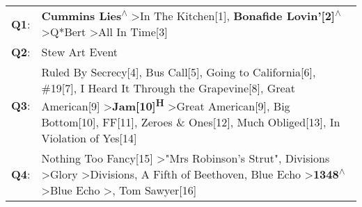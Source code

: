 \begin{supertabular}{p{0.03\textwidth}p{0.92\textwidth}}
 \textbf{Q1}:  &                                                                                                                                                                                                                                                                                                                                                       \textbf{Cummins Lies\textsuperscript{$\wedge$}} \textgreater \enspace In The Kitchen[1]\textsuperscript{}, \enspace \textbf{Bonafide Lovin'[2]\textsuperscript{$\wedge$}} \textgreater \enspace Q*Bert\textsuperscript{} \textgreater \enspace All In Time[3]\textsuperscript{}  \enspace  \\
 \textbf{Q2}:  &                                                                                                                                                                                                                                                                                                                                                                                                                                                                                                                                                                                                      Stew Art Event\textsuperscript{}  \enspace  \\
 \textbf{Q3}:  &  Ruled By Secrecy[4]\textsuperscript{}, \enspace Bus Call[5]\textsuperscript{}, \enspace Going to California[6]\textsuperscript{}, \enspace \#19[7]\textsuperscript{}, \enspace I Heard It Through the Grapevine[8]\textsuperscript{}, \enspace Great American[9]\textsuperscript{} \textgreater \enspace \textbf{Jam[10]\textsuperscript{H}} \textgreater \enspace Great American[9]\textsuperscript{}, \enspace Big Bottom[10]\textsuperscript{}, \enspace FF[11]\textsuperscript{}, \enspace Zeroes \& Ones[12]\textsuperscript{}, \enspace Much Obliged[13]\textsuperscript{}, \enspace In Violation of Yes[14]\textsuperscript{}  \enspace  \\
 \textbf{Q4}:  &                                                                                           Nothing Too Fancy[15]\textsuperscript{} \textgreater \enspace "Mrs Robinson's Strut"\textsuperscript{}, \enspace Divisions\textsuperscript{} \textgreater \enspace Glory\textsuperscript{} \textgreater \enspace Divisions\textsuperscript{}, \enspace A Fifth of Beethoven\textsuperscript{}, \enspace Blue Echo\textsuperscript{} \textgreater \enspace \textbf{1348\textsuperscript{$\wedge$}} \textgreater \enspace Blue Echo\textsuperscript{} \textgreater {}\textsuperscript{}, \enspace Tom Sawyer[16]\textsuperscript{}  \enspace  \\

\end{supertabular}
